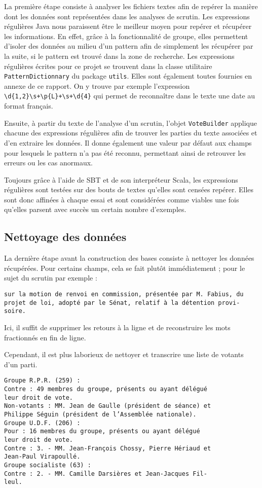 La première étape consiste à analyser les fichiers textes afin de repérer la manière dont les données sont représentées dans les analyses de scrutin. Les expressions régulières Java nous paraissent être le meilleur moyen pour repérer et récupérer les informations. En effet, grâce à la fonctionnalité de groupe, elles permettent d'isoler des données au milieu d'un pattern afin de simplement les récupérer par la suite, si le pattern est trouvé dans la zone de recherche. Les expressions régulières écrites pour ce projet se trouvent dans la classe utilitaire \verb|PatternDictionnary| du package \verb|utils|. Elles sont également toutes fournies en annexe de ce rapport. On y trouve par exemple l'expression \verb|\d{1,2}\s+\p{L}+\s+\d{4}| qui permet de reconnaître dans le texte une date au format français.

Ensuite, à partir du texte de l'analyse d'un scrutin, l'objet \verb|VoteBuilder| applique chacune des expressions régulières afin de trouver les parties du texte associées et d'en extraire les données. Il donne également une valeur par défaut aux champs pour lesquels le pattern n'a pas été reconnu, permettant ainsi de retrouver les erreurs ou les cas anormaux.

Toujours grâce à l'aide de SBT et de son interpréteur Scala, les expressions régulières sont testées sur des bouts de textes qu'elles sont censées repérer. Elles sont donc affinées à chaque essai et sont considérées comme viables une fois qu'elles parsent avec succès un certain nombre d'exemples.

\subsection{Nettoyage des données}

La dernière étape avant la construction des bases consiste à nettoyer les données récupérées. Pour certains champs, cela se fait plutôt immédiatement ; pour le sujet du scrutin par exemple :
\begin{verbatim}
sur la motion de renvoi en commission, présentée par M. Fabius, du
projet de loi, adopté par le Sénat, relatif à la détention provi-
soire.
\end{verbatim}
Ici, il suffit de supprimer les retours à la ligne et de reconstruire les mots fractionnés en fin de ligne.

Cependant, il est plus laborieux de nettoyer et transcrire une liste de votants d'un parti.
\begin{verbatim}
Groupe R.P.R. (259) :
Contre : 49 membres du groupe, présents ou ayant délégué
leur droit de vote.
Non-votants : MM. Jean de Gaulle (président de séance) et
Philippe Séguin (président de l’Assemblée nationale).
Groupe U.D.F. (206) :
Pour : 16 membres du groupe, présents ou ayant délégué
leur droit de vote.
Contre : 3. - MM. Jean-François Chossy, Pierre Hériaud et
Jean-Paul Virapoullé.
Groupe socialiste (63) :
Contre : 2. - MM. Camille Darsières et Jean-Jacques Fil-
leul.
\end{verbatim}

